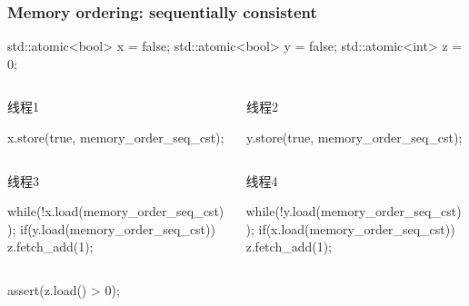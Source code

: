 \documentclass[UTF8,lualatex]{ctexbeamer}
\begin{document}
\begin{frame}[fragile]
    \frametitle{Memory ordering: sequentially consistent}
    \scriptsize
    \begin{cppcode}
        std::atomic<bool> x = {false};
        std::atomic<bool> y = {false};
        std::atomic<int> z = {0};
    \end{cppcode}

    \begin{columns}
        \begin{column}{.5\textwidth}
            \begin{block}{线程1}
                \begin{cppcode}
                    x.store(true, memory_order_seq_cst);
                \end{cppcode}
            \end{block}
        \end{column}
        \begin{column}{.5\textwidth}
            \begin{block}{线程2}
                \begin{cppcode}
                    y.store(true, memory_order_seq_cst);
                \end{cppcode}
            \end{block}
        \end{column}
    \end{columns}
    \begin{columns}
        \begin{column}{.5\textwidth}
            \begin{block}{线程3}
                \begin{cppcode}
                    while(!x.load(memory_order_seq_cst));
                    if(y.load(memory_order_seq_cst))
                    {
                        z.fetch_add(1);
                    }
                \end{cppcode}
            \end{block}
        \end{column}
        \begin{column}{.5\textwidth}
            \begin{block}{线程4}
                \begin{cppcode}
                    while(!y.load(memory_order_seq_cst));
                    if(x.load(memory_order_seq_cst))
                    {
                        z.fetch_add(1);
                    }
                \end{cppcode}
            \end{block}
        \end{column}
    \end{columns}

    \begin{cppcode}
        assert(z.load() > 0);
    \end{cppcode}
\end{frame}
\end{document}
